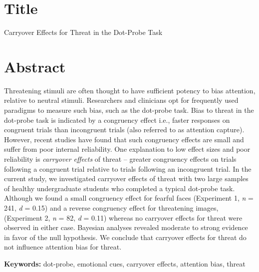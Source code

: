 \documentclass{article}
\begin{document}
	\section{Title}



	{\color{4472C4}Carryover Effects for Threat in the Dot-Probe Task}







	\section{Abstract}



	Threatening stimuli are often thought to have sufficient potency to bias attention, relative to neutral stimuli. Researchers and clinicians opt for frequently used paradigms to measure such bias, such as the dot-probe task. Bias to threat in the dot-probe task is indicated by a congruency effect i.e., faster responses on congruent trials than incongruent trials (also referred to as attention capture). However, recent studies have found that such congruency effects are small and suffer from poor internal reliability. One explanation to low effect sizes and poor reliability is \emph{carryover effects} of threat -- greater congruency effects on trials {\color{4472C4}following }a congruent trial relative to trials following an incongruent trial. In the current study, we investigated carryover effects of threat with two large samples of healthy undergraduate students who completed a typical dot-probe task. Although we found a small congruency effect for fearful faces (Experiment 1, \emph{n} = 241, \emph{d }= 0.15) and a reverse congruency effect for threatening images, (Experiment 2, \emph{n }= 82, \emph{d }= 0.11) whereas no carryover effects for threat were observed in either case. Bayesian analyses revealed moderate to strong evidence in favor of the null hypothesis. We conclude that carryover effects for threat do not influence attention bias for threat.







	\textbf{Keywords:} dot-probe, emotional cues, carryover effects, attention bias, threat
\end{document}
